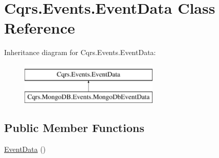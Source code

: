 \hypertarget{classCqrs_1_1Events_1_1EventData}{}\section{Cqrs.\+Events.\+Event\+Data Class Reference}
\label{classCqrs_1_1Events_1_1EventData}
Inheritance diagram for Cqrs.\+Events.\+Event\+Data\+:\begin{figure}[H]
\begin{center}
\leavevmode
\includegraphics[height=2.000000cm]{classCqrs_1_1Events_1_1EventData}
\end{center}
\end{figure}
\subsection*{Public Member Functions}
\begin{DoxyCompactItemize}
\item 
\hyperlink{classCqrs_1_1Events_1_1EventData_a0387ea22e5cdc085caf113a82f5ace18_a0387ea22e5cdc085caf113a82f5ace18}{Event\+Data} ()
\end{DoxyCompactItemize}
